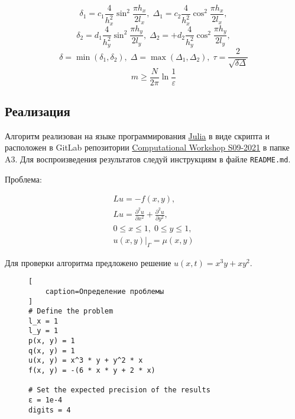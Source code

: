 \begin{itemize}
\begin{equation}
    \delta_1 = c_1 \frac{4}{h_x^2} \sin^2{\frac{\pi h_x}{2 l_x}}, \; \Delta_1 = c_2 \frac{4}{h_x^2} \cos^2{\frac{\pi h_x}{2 l_x}},
  \end{equation}
  \begin{equation}
    \delta_2 = d_1 \frac{4}{h_y^2} \sin^2{\frac{\pi h_y}{2 l_y}}, \; \Delta_2 =  + d_2 \frac{4}{h_y^2} \cos^2{\frac{\pi h_y}{2 l_y}},
  \end{equation}
  \begin{equation}
    \delta = \min(\delta_1, \delta_2), \; \Delta = \max(\Delta_1, \Delta_2), \; \tau = \frac{2}{\sqrt{\delta \Delta}}
  \end{equation}
  \begin{equation}
    m \geqslant \frac{N}{2 \pi} \ln{\frac{1}{\varepsilon}}
  \end{equation}
\end{itemize}

\subsection*{Реализация}

Алгоритм реализован на языке программирования \href{https://julialang.org/}{Julia} в виде скрипта и расположен в GitLab репозитории \href{https://gitlab.com/paveloom-g/university/s09-2021/computational-workshop}{Computational Workshop S09-2021} в папке A3. Для воспроизведения результатов следуй инструкциям в файле {\footnotesize \texttt{README.md}}. \npar

Проблема:

\begin{equation}
\begin{gathered}
  L u = -f(x, y), \\
  L u = \frac{\partial^2 u}{\partial x^2} + \frac{\partial^2 u}{\partial y^2}, \\
  0 \leq x \leq 1, \; 0 \leq y \leq 1, \\
  \left. u(x, y) \right|_{\Gamma} = \mu(x, y)
\end{gathered}
\end{equation}

Для проверки алгоритма предложено решение $ u(x, t) = x^3 y + x y^2 $.

\captionsetup{singlelinecheck=false, justification=justified}

\begin{figure}[h!]
\begin{lstlisting}[
    caption=Определение проблемы
]
# Define the problem
l_x = 1
l_y = 1
p(x, y) = 1
q(x, y) = 1
u(x, y) = x^3 * y + y^2 * x
f(x, y) = -(6 * x * y + 2 * x)

# Set the expected precision of the results
ε = 1e-4
digits = 4
\end{lstlisting}
\end{figure}

